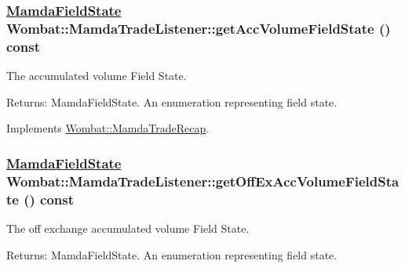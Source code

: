 \hypertarget{classWombat_1_1MamdaTradeListener_48419d9b8e7c932ea3ee9750f2619d2d}{
\subsubsection[getAccVolumeFieldState]{\setlength{\rightskip}{0pt plus 5cm}\hyperlink{namespaceWombat_93aac974f2ab713554fd12a1fa3b7d2a}{Mamda\-Field\-State} Wombat::Mamda\-Trade\-Listener::get\-Acc\-Volume\-Field\-State () const}}
\label{classWombat_1_1MamdaTradeListener_48419d9b8e7c932ea3ee9750f2619d2d}


The accumulated volume Field State. 

\begin{Desc}
\item[Returns:]Mamda\-Field\-State. An enumeration representing field state. \end{Desc}


Implements \hyperlink{classWombat_1_1MamdaTradeRecap_ee7ddb433c0825515166da7226852b4b}{Wombat::Mamda\-Trade\-Recap}.\hypertarget{classWombat_1_1MamdaTradeListener_ebdb316690769ff380d8e1950a878de3}{
\subsubsection[getOffExAccVolumeFieldState]{\setlength{\rightskip}{0pt plus 5cm}\hyperlink{namespaceWombat_93aac974f2ab713554fd12a1fa3b7d2a}{Mamda\-Field\-State} Wombat::Mamda\-Trade\-Listener::get\-Off\-Ex\-Acc\-Volume\-Field\-State () const}}
\label{classWombat_1_1MamdaTradeListener_ebdb316690769ff380d8e1950a878de3}


The off exchange accumulated volume Field State. 

\begin{Desc}
\item[Returns:]Mamda\-Field\-State. An enumeration representing field state. \end{Desc}


